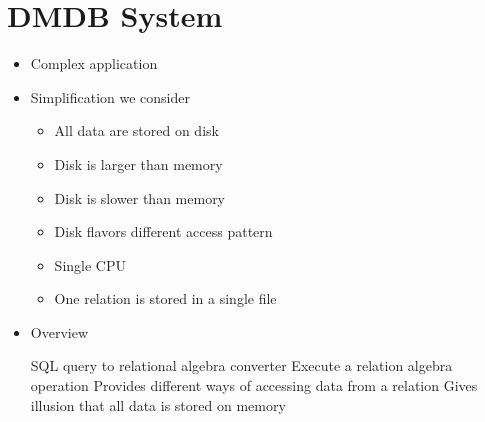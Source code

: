 
\section{DMDB System}
\begin{itemize}
    \item Complex application
    \item Simplification we consider
        \begin{itemize}
            \item All data are stored on disk
            \item Disk is larger than memory
            \item Disk is slower than memory
            \item Disk flavors different access pattern
            \item Single CPU
            \item One relation is stored in a single file
        \end{itemize}
    \item Overview
        \begin{itemize}
             SQL query to relational algebra converter
             Execute a relation algebra operation
             Provides different ways of accessing data from a relation
             Gives illusion that all data is stored on memory
        \end{itemize}
\end{itemize}


